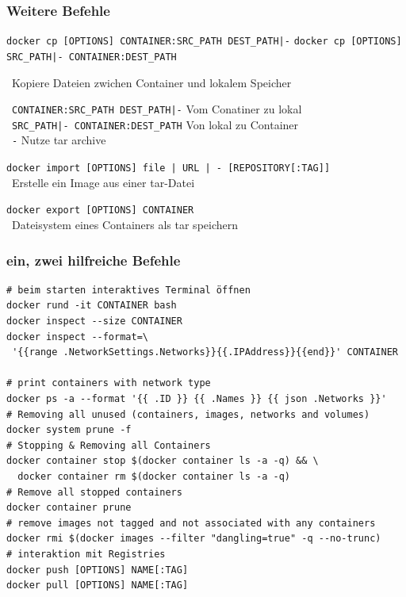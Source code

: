 \documentclass[22pt]{beamer}
\newcommand{\code}[1]{\colorbox{darkgray!20}{\texttt{#1}}}
\begin{document}
\begin{frame}[fragile]
    \frametitle{Weitere Befehle}
    \code{docker cp [OPTIONS] CONTAINER:SRC\_PATH DEST\_PATH|-}
    \code{docker cp [OPTIONS] SRC\_PATH|- CONTAINER:DEST\_PATH}

    \- \ Kopiere Dateien zwichen Container und lokalem Speicher\vspace{5pt}

    \-  \ \code{CONTAINER:SRC\_PATH DEST\_PATH|-} Vom Conatiner zu lokal\\
    \-  \ \code{SRC\_PATH|- CONTAINER:DEST\_PATH} Von lokal zu Container\\
    \-  \ \code{-} Nutze tar archive
    \medskip\medskip
    
    \code{docker import [OPTIONS] file | URL | - [REPOSITORY[:TAG]]}\\
    \-  \ Erstelle ein Image aus einer tar-Datei  \medskip

    \code{docker export [OPTIONS] CONTAINER}\\
    \-  \ Dateisystem eines Containers als tar speichern \medskip

\end{frame}

\begin{frame}[fragile]
    \frametitle{ein, zwei hilfreiche Befehle}
    \begin{verbatim}
# beim starten interaktives Terminal öffnen
docker rund -it CONTAINER bash 
docker inspect --size CONTAINER
docker inspect --format=\
 '{{range .NetworkSettings.Networks}}{{.IPAddress}}{{end}}' CONTAINER

# print containers with network type
docker ps -a --format '{{ .ID }} {{ .Names }} {{ json .Networks }}'
# Removing all unused (containers, images, networks and volumes)
docker system prune -f
# Stopping & Removing all Containers
docker container stop $(docker container ls -a -q) && \
  docker container rm $(docker container ls -a -q)
# Remove all stopped containers
docker container prune
# remove images not tagged and not associated with any containers
docker rmi $(docker images --filter "dangling=true" -q --no-trunc)
# interaktion mit Registries
docker push [OPTIONS] NAME[:TAG]
docker pull [OPTIONS] NAME[:TAG]
    \end{verbatim}
\end{frame}
\end{document}
